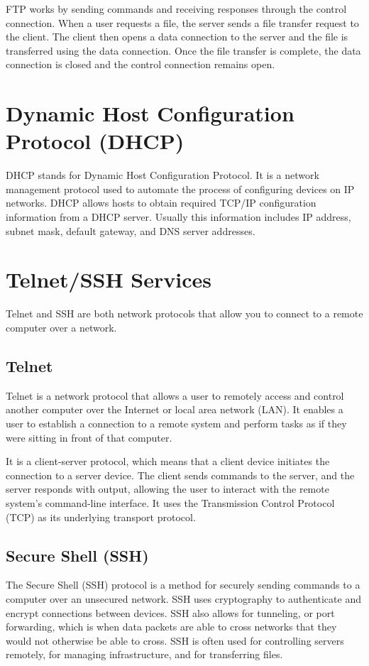 \documentclass[12pt,titlepage]{article}
\begin{document}
FTP works by sending commands and receiving responses through the control connection. When a user requests
a file, the server sends a file transfer request to the client. The client then opens a data connection to the
server and the file is transferred using the data connection. Once the file transfer is complete, the data
connection is closed and the control connection remains open. \cite{hostinger-ftp}

\section{Dynamic Host Configuration Protocol (DHCP)}

DHCP stands for Dynamic Host Configuration Protocol. It is a network management protocol used to automate
the process of configuring devices on IP networks. DHCP allows hosts to obtain required TCP/IP configuration information
from a DHCP server. Usually this information includes IP address, subnet mask, default gateway, and DNS server
addresses. \cite{microsoft-dhcp}

\pagebreak

\section{Telnet/SSH Services}

Telnet and SSH are both network protocols that allow you to connect to a remote computer over a network.

\subsection{Telnet}

Telnet is a network protocol that allows a user to remotely access and control
another computer over the Internet or local area network (LAN). It enables a user
to establish a connection to a remote system and perform tasks as if they were
sitting in front of that computer.

It is a client-server protocol, which means that a client device initiates the connection
to a server device. The client sends commands to the server, and the server responds
with output, allowing the user to interact with the remote system’s command-line interface.
It uses the Transmission Control Protocol (TCP) as its underlying transport protocol. \cite{cloudns-telnet}

\subsection{Secure Shell (SSH)}

The Secure Shell (SSH) protocol is a method for securely sending commands to a computer over an
unsecured network. SSH uses cryptography to authenticate and encrypt connections between devices.
SSH also allows for tunneling, or port forwarding, which is when data packets are able to cross
networks that they would not otherwise be able to cross. SSH is often used for controlling servers
remotely, for managing infrastructure, and for transferring files. \cite{cloudflare-ssh}

\pagebreak

\printbibliography
\end{document}
